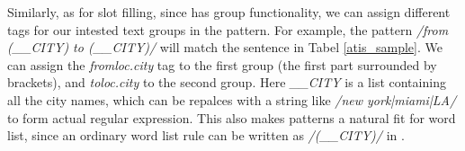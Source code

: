 Similarly, as for slot filling, since \RE has group functionality, we can assign different tags for our intested text groups in the pattern. For example, the pattern \textsl{/from (\_\_CITY) to (\_\_CITY)/} will match the sentence in Tabel \ref{atis_sample}. We can assign the \emph{fromloc.city} tag to the first group (the first part surrounded by brackets), and \emph{toloc.city} to the second group. Here \emph{\_\_CITY} is a list containing all the city names, which can be repalces with a string like \textsl{/new york|miami|LA/} to form actual regular expression. This also makes \RE patterns a natural fit for word list, since an ordinary word list rule can be written as \textsl{/(\_\_CITY)/} in \RE.

